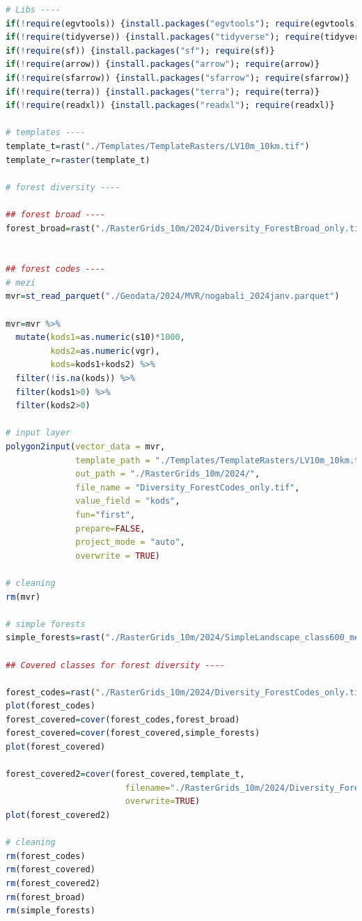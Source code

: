 \documentclass[
]{book}
\begin{document}
\begin{lstlisting}[language=R]
# Libs ----
if(!require(egvtools)) {install.packages("egvtools"); require(egvtools)}
if(!require(tidyverse)) {install.packages("tidyverse"); require(tidyverse)}
if(!require(sf)) {install.packages("sf"); require(sf)}
if(!require(arrow)) {install.packages("arrow"); require(arrow)}
if(!require(sfarrow)) {install.packages("sfarrow"); require(sfarrow)}
if(!require(terra)) {install.packages("terra"); require(terra)}
if(!require(readxl)) {install.packages("readxl"); require(readxl)}

# templates ----
template_t=rast("./Templates/TemplateRasters/LV10m_10km.tif")
template_r=raster(template_t)

# forest diversity ----

## forest broad ----
forest_broad=rast("./RasterGrids_10m/2024/Diversity_ForestBroad_only.tif")


## forest codes ----
# mezi
mvr=st_read_parquet("./Geodata/2024/MVR/nogabali_2024janv.parquet")

mvr=mvr %>% 
  mutate(kods1=as.numeric(s10)*1000,
         kods2=as.numeric(vgr),
         kods=kods1+kods2) %>% 
  filter(!is.na(kods)) %>% 
  filter(kods1>0) %>% 
  filter(kods2>0)

# input layer
polygon2input(vector_data = mvr,
              template_path = "./Templates/TemplateRasters/LV10m_10km.tif",
              out_path = "./RasterGrids_10m/2024/",
              file_name = "Diversity_ForestCodes_only.tif",
              value_field = "kods",
              fun="first",
              prepare=FALSE,
              project_mode = "auto",
              overwrite = TRUE)

# cleaning
rm(mvr)

# simple forests
simple_forests=rast("./RasterGrids_10m/2024/SimpleLandscape_class600_meziem_premask.tif")

## Covered classes for forest diversity ----

forest_codes=rast("./RasterGrids_10m/2024/Diversity_ForestCodes_only.tif")
plot(forest_codes)
forest_covered=cover(forest_codes,forest_broad)
forest_covered=cover(forest_covered,simple_forests)
plot(forest_covered)

forest_covered2=cover(forest_covered,template_t,
                        filename="./RasterGrids_10m/2024/Diversity_ForestsDetailed.tif",
                        overwrite=TRUE)
plot(forest_covered2)

# cleaning
rm(forest_codes)
rm(forest_covered)
rm(forest_covered2)
rm(forest_broad)
rm(simple_forests)




\end{lstlisting}
\end{document}
